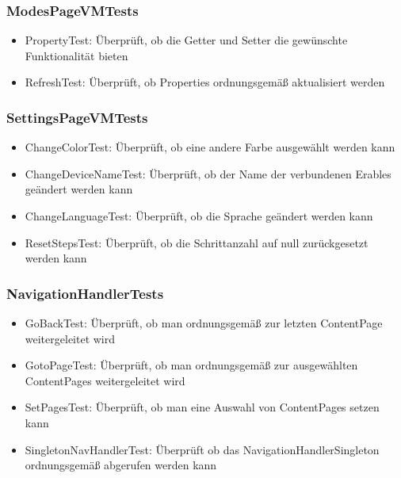 \documentclass[../validierung.tex]{subfiles}
\begin{document}
		\subsubsection{ModesPageVMTests}
			\begin{itemize}
				\item PropertyTest: Überprüft, ob die Getter und Setter die gewünschte Funktionalität bieten
				\item RefreshTest: Überprüft, ob Properties ordnungsgemäß aktualisiert werden
			\end{itemize}
		\subsubsection{SettingsPageVMTests}
			\begin{itemize}
				\item ChangeColorTest: Überprüft, ob eine andere Farbe ausgewählt werden kann
				\item ChangeDeviceNameTest: Überprüft, ob der Name der verbundenen Erables geändert werden kann
				\item ChangeLanguageTest: Überprüft, ob die Sprache geändert werden kann
				\item ResetStepsTest: Überprüft, ob die Schrittanzahl auf null zurückgesetzt werden kann
			\end{itemize}
		\subsubsection{NavigationHandlerTests}
			\begin{itemize}
				\item GoBackTest: Überprüft, ob man ordnungsgemäß zur letzten ContentPage weitergeleitet wird
				\item GotoPageTest: Überprüft, ob man ordnungsgemäß zur ausgewählten ContentPages weitergeleitet wird
				\item SetPagesTest: Überprüft, ob man eine Auswahl von ContentPages setzen kann
				\item SingletonNavHandlerTest: Überprüft ob das NavigationHandlerSingleton ordnungsgemäß abgerufen werden kann
			\end{itemize}
\end{document}
